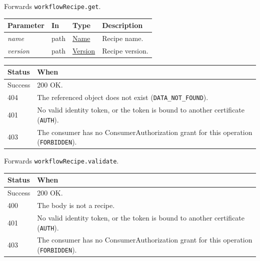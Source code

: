\documentclass[a4paper]{arrowhead}
\newcommand{\fparam}[1]{\textit{\textcolor{ArrowheadBlue}{#1}}}
\newcommand{\pref}[1]{{\textcolor{ArrowheadGrey}{\hyperref[sec:model:primitives:#1]{#1}}}}
\begin{document}
Forwards \texttt{workflow\allowbreak{}Recipe.\allowbreak{}get}.

{\small
\begin{longtable}{|p{3.0cm}|p{1.4cm}|p{3.2cm}|p{8.2cm}|}

\hline
\rowcolor{gray!33} Parameter & In & Type & Description \\ \hline
\endhead
\fparam{name} & path & \pref{Name} & Recipe name. \\ \hline
\fparam{version} & path & \pref{Version} & Recipe version. \\ \hline
\end{longtable}
}


{\small
\begin{longtable}{|p{2.0cm}|p{13.8cm}|}

\hline
\rowcolor{gray!33} Status & When \\ \hline
\endhead
Success & 200 OK. \\ \hline
404 & The referenced object does not exist (\texttt{DATA\_\allowbreak{}NOT\_\allowbreak{}FOUND}). \\ \hline
401 & No valid identity token, or the token is bound to another certificate (\texttt{AUTH}). \\ \hline
403 & The consumer has no ConsumerAuthorization grant for this operation (\texttt{FORBIDDEN}). \\ \hline
\end{longtable}
}

Forwards \texttt{workflow\allowbreak{}Recipe.\allowbreak{}validate}.

{\small
\begin{longtable}{|p{2.0cm}|p{13.8cm}|}

\hline
\rowcolor{gray!33} Status & When \\ \hline
\endhead
Success & 200 OK. \\ \hline
400 & The body is not a recipe. \\ \hline
401 & No valid identity token, or the token is bound to another certificate (\texttt{AUTH}). \\ \hline
403 & The consumer has no ConsumerAuthorization grant for this operation (\texttt{FORBIDDEN}). \\ \hline
\end{longtable}
}
\end{document}
